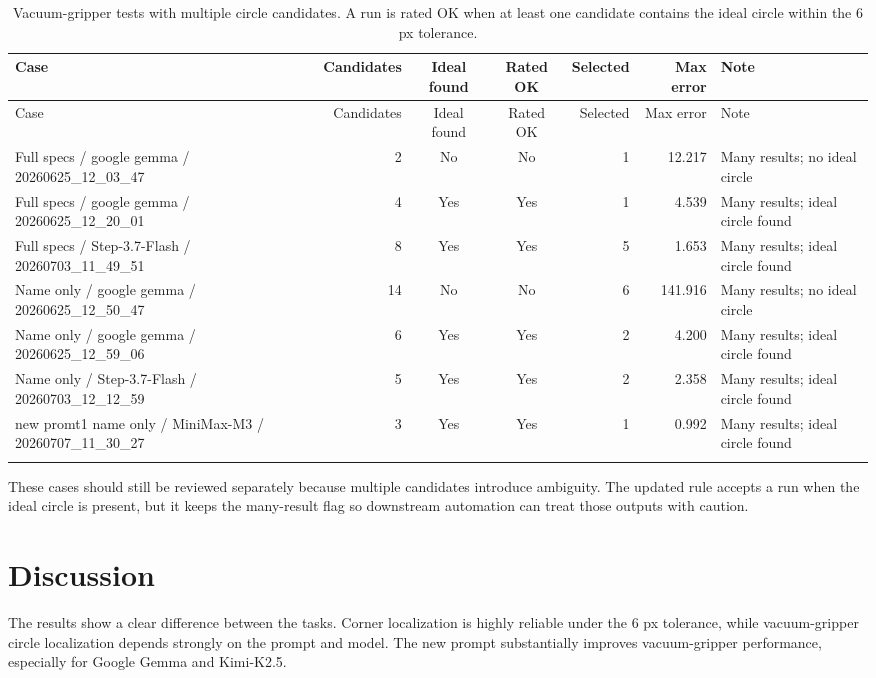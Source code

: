 \documentclass[11pt,a4paper]{article}
\begin{document}
\begingroup
\scriptsize
\setlength{\tabcolsep}{2.5pt}
\begin{longtable}{L{5.6cm}rccrrL{2.8cm}}
\toprule
Case & Candidates & Ideal found & Rated OK & Selected & Max error & Note \\
\midrule
\endfirsthead
\toprule
Case & Candidates & Ideal found & Rated OK & Selected & Max error & Note \\
\midrule
\endhead
Full specs / google gemma / 20260625\_12\_03\_47 & 2 & No & No & 1 & 12.217 & Many results; no ideal circle \\
Full specs / google gemma / 20260625\_12\_20\_01 & 4 & Yes & Yes & 1 & 4.539 & Many results; ideal circle found \\
Full specs / Step-3.7-Flash / 20260703\_11\_49\_51 & 8 & Yes & Yes & 5 & 1.653 & Many results; ideal circle found \\
Name only / google gemma / 20260625\_12\_50\_47 & 14 & No & No & 6 & 141.916 & Many results; no ideal circle \\
Name only / google gemma / 20260625\_12\_59\_06 & 6 & Yes & Yes & 2 & 4.200 & Many results; ideal circle found \\
Name only / Step-3.7-Flash / 20260703\_12\_12\_59 & 5 & Yes & Yes & 2 & 2.358 & Many results; ideal circle found \\
new promt1 name only / MiniMax-M3 / 20260707\_11\_30\_27 & 3 & Yes & Yes & 1 & 0.992 & Many results; ideal circle found \\
\bottomrule
\caption{Vacuum-gripper tests with multiple circle candidates. A run is rated OK when at least one candidate contains the ideal circle within the 6 px tolerance.}
\end{longtable}
\endgroup

These cases should still be reviewed separately because multiple candidates introduce ambiguity. The updated rule accepts a run when the ideal circle is present, but it keeps the many-result flag so downstream automation can treat those outputs with caution.

\section{Discussion}

The results show a clear difference between the tasks. Corner localization is highly reliable under the 6 px tolerance, while vacuum-gripper circle localization depends strongly on the prompt and model. The new prompt substantially improves vacuum-gripper performance, especially for Google Gemma and Kimi-K2.5.
\end{document}
